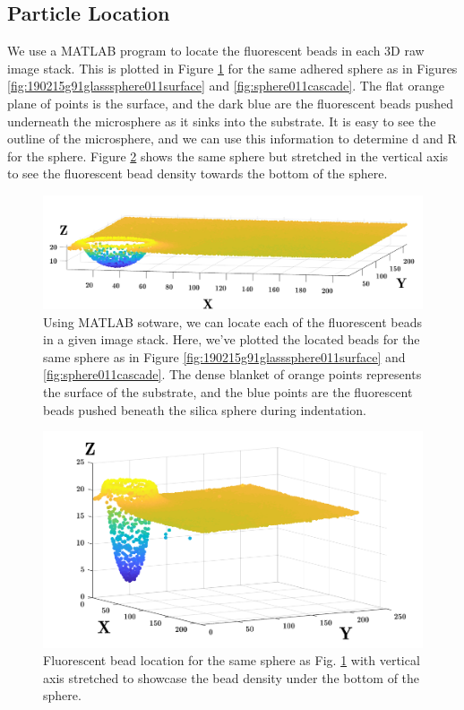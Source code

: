 \subsection{Particle Location}
We use a MATLAB program to locate the fluorescent beads in each 3D raw image stack. This is plotted in Figure \ref{fig:particlelocatednormalized} for the same adhered sphere as in Figures \ref{fig:190215g91glasssphere011surface} and \ref{fig:sphere011cascade}. The flat orange plane of points is the surface, and the dark blue are the fluorescent beads pushed underneath the microsphere as it sinks into the substrate. It is easy to see the outline of the microsphere, and we can use this information to determine d and R for the sphere. 
Figure \ref{fig:particlelocatedstretched} shows the same sphere but stretched in the vertical axis to see the fluorescent bead density towards the bottom of the sphere. 
\begin{figure}[h]
	\centering
	\includegraphics[width=\linewidth]{Chapters/Figures/sphere011_ia/particle_located_normalized}
	\caption[Particle Located: Normalized-Axes]{Using MATLAB sotware, we can locate each of the fluorescent beads in a given image stack. Here, we've plotted the located beads for the same sphere as in Figure \ref{fig:190215g91glasssphere011surface} and \ref{fig:sphere011cascade}. The dense blanket of orange points represents the surface of the substrate, and the blue points are the fluorescent beads pushed beneath the silica sphere during indentation.}
	\label{fig:particlelocatednormalized}
\end{figure}


\begin{figure}[h!]
	\centering
	\includegraphics[width=\linewidth]{Chapters/Figures/sphere011_ia/particle_located_stretched}
	\caption[Particle Located: Stretched-Axes]{Fluorescent bead location for the same sphere as Fig.  \ref{fig:particlelocatednormalized} with vertical axis stretched to showcase the bead density under the bottom of the sphere.}
	\label{fig:particlelocatedstretched}
\end{figure}

